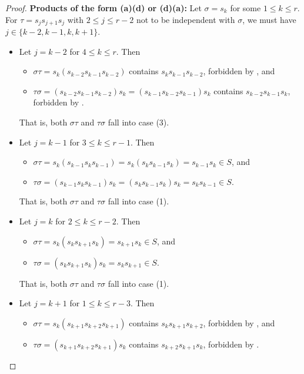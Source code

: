 \documentclass[10pt,a4paper]{amsart}
\begin{document}
\begin{proof}
    
\smallskip

\noindent \textbf{Products of the form (a)(d) or (d)(a):}
    Let $\sigma=s_k$ for some $1\leq k\leq r$. For $\tau=s_js_{j+1}s_j$ with $2\leq j\leq r-2$ not to be independent with $\sigma$, we must have $j\in\{k-2, k-1, k, k+1\}$.
    \begin{itemize}
        \item Let $j=k-2$ for $4\leq k\leq r$. Then \begin{itemize}
            \item $\sigma\tau=s_k(s_{k-2}s_{k-1}s_{k-2})$ contains $s_ks_{k-1}s_{k-2}$, forbidden by , and
            \item $\tau\sigma=(s_{k-2}s_{k-1}s_{k-2})s_k=(s_{k-1}s_{k-2}s_{k-1})s_k$
            contains $s_{k-2}s_{k-1}s_k$, forbidden by .
        \end{itemize}
        That is, both $\sigma\tau$ and $\tau\sigma$ fall into case (3).
        \item Let $j=k-1$ for $3\leq k\leq r-1$. Then \begin{itemize}
            \item $\sigma\tau=s_k(s_{k-1}s_ks_{k-1})=s_k(s_ks_{k-1}s_k)=s_{k-1}s_k\in S$, and
            \item $\tau\sigma=(s_{k-1}s_ks_{k-1})s_k=(s_ks_{k-1}s_k)s_k=s_ks_{k-1}\in S$.
        \end{itemize}
        That is, both $\sigma\tau$ and $\tau\sigma$ fall into case (1).
        \item Let $j=k$ for $2\leq k\leq r-2$. Then \begin{itemize}
            \item $\sigma\tau=s_k(s_ks_{k+1}s_k)=s_{k+1}s_k\in S$, and
            \item $\tau\sigma=(s_ks_{k+1}s_k)s_k=s_ks_{k+1}\in S$.
        \end{itemize}
        That is, both $\sigma\tau$ and $\tau\sigma$ fall into case (1).
        \item Let $j=k+1$ for $1\leq k\leq r-3$. Then \begin{itemize}
            \item $\sigma\tau=s_k(s_{k+1}s_{k+2}s_{k+1})$ contains $s_ks_{k+1}s_{k+2}$, forbidden by , and
            \item $\tau\sigma=(s_{k+1}s_{k+2}s_{k+1})s_k$ contains $s_{k+2}s_{k+1}s_k$, forbidden by .
        \end{itemize}

\end{itemize}
\end{proof}
\end{document}

